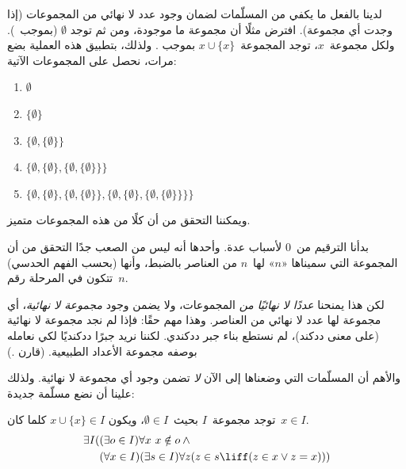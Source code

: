 \documentclass[../../../include/open-logic-section]{subfiles}
\begin{document}

لدينا بالفعل ما يكفي من المسلّمات لضمان وجود عدد لا نهائي من المجموعات
(إذا وجدت أي مجموعة). افترض مثلًا أن مجموعة ما موجودة، ومن ثم توجد
$\emptyset$ (بموجب~). ولكل
مجموعة~$x$، توجد المجموعة~$x \cup \{x\}$ بموجب
. ولذلك، بتطبيق هذه العملية
بضع مرات، نحصل على المجموعات الآتية:
\begin{enumerate}
	\item[0.] $\emptyset$ %
	\item[1.] $ \{\emptyset\}$ %
	\item[2.] $\{\emptyset, \{\emptyset\}\}$ %
	\item[3.] $\{\emptyset, \{\emptyset\}, \{\emptyset, \{\emptyset\}\}\}$ %
	\item[4.] $\{\emptyset, \{\emptyset\}, \{\emptyset, \{\emptyset\}\}, \{\emptyset, \{\emptyset\}, \{\emptyset, \{\emptyset\}\}\}\}$%
\end{enumerate}
ويمكننا التحقق من أن كلًا من هذه المجموعات متميز.

بدأنا الترقيم من~$0$ لأسباب عدة. وأحدها أنه ليس من الصعب جدًا التحقق
من أن المجموعة التي سميناها «$n$» لها~$n$ من العناصر بالضبط، وأنها
(بحسب الفهم الحدسي) تتكون في المرحلة رقم~$n$.

لكن هذا يمنحنا \emph{عددًا لا نهائيًا من} المجموعات، ولا يضمن وجود
\emph{مجموعة لا نهائية}، أي مجموعة لها عدد لا نهائي من العناصر.
وهذا مهم حقًا: فإذا لم نجد مجموعة لا نهائية (على معنى ددكند)، لم
نستطع بناء جبر ددكندي. لكننا نريد جبرًا ددكنديًا لكي نعامله بوصفه
مجموعة الأعداد الطبيعية. (قارن
.)

والأهم أن المسلّمات التي وضعناها إلى الآن \emph{لا} تضمن وجود أي
مجموعة لا نهائية. ولذلك علينا أن نضع مسلّمة جديدة:

\begin{axiom}[اللانهاية]
توجد مجموعة~$I$ بحيث~$\emptyset \in I$، ويكون
$x \cup \{x\} \in I$ كلما كان~$x \in I$.
\begin{align*}
	\exists I( & (\exists o \in I)\forall x\ x \notin o \land {}\\
	& (\forall x \in I)(\exists s \in I)\forall z(z \in s \liff (z \in x \lor z = x)))
\end{align*}
\end{axiom}
\end{document}
